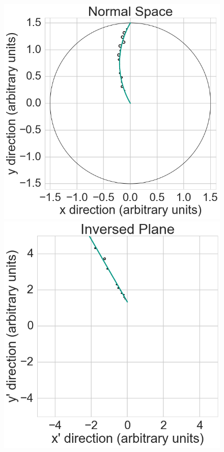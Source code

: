 \begin{figure}
 \centering
 \includegraphics[scale=0.3]{figures/theory/legendre_1.png}
 \hspace*{1cm}
 \includegraphics[scale=0.3]{figures/theory/legendre_2.png}
 

\end{figure}
